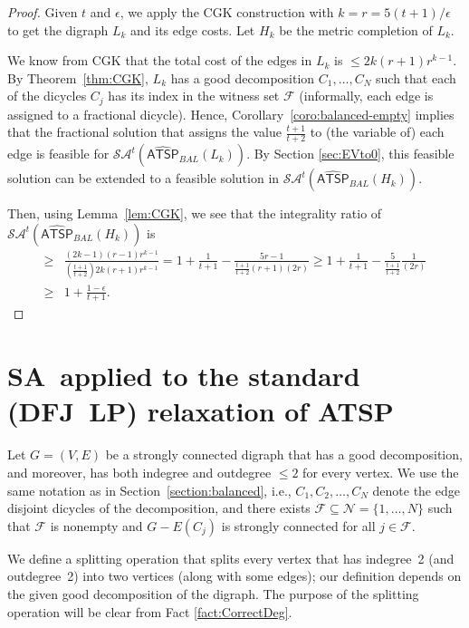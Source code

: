 \documentclass[11pt]{article}
\newcommand{\iSA}{\textsf{SA}}
\newcommand{\atspbalpolytope}{\widehat{\textsf{ATSP}}_{\mathit{BAL}}}
\newcommand{\cindset}{\mathcal{N}}
\newcommand{\fracset}{\mathcal{F}}
\newcommand{\saop}{\mathcal{SA}}
\newcommand{\homog}[1]{{#1}}
\begin{document}
\begin{proof}
Given $t$ and $\epsilon$, we apply the CGK construction
with $k=r= 5(t+1)/\epsilon$ to get the digraph $L_k$
and its edge costs. Let $H_k$ be the metric completion of $L_k$.

We know from CGK \cite{CGK06} that
the total cost of the edges in $L_k$ is $\leq 2k(r+1)r^{k-1}$.
By Theorem~\ref{thm:CGK}, $L_k$ has a good decomposition $C_1,\dots,C_N$
such that each of the dicycles $C_j$ has its index in the witness
set $\fracset$ (informally, each edge is assigned to a fractional
dicycle).
Hence, Corollary~\ref{coro:balanced-empty}
implies that the fractional solution that
assigns the value $\frac{t+1}{t+2}$ to (the variable of) each edge
is feasible for $\saop^t(\homog{\atspbalpolytope(L_k)})$. By Section \ref{sec:EVto0}, this feasible solution can
be extended to a feasible solution in $\saop^t(\homog{\atspbalpolytope(H_k)})$.

Then, using Lemma~\ref{lem:CGK},
we see that the integrality ratio of
$\saop^t(\homog{\atspbalpolytope(H_k)})$ is
\begin{align*}
\geq &
\frac{(2k-1)(r-1)r^{k-1}}{(\frac{t+1}{t+2})2k(r+1)r^{k-1}}
= 1+\frac{1}{t+1}-\frac{5r-1}{\frac{t+1}{t+2}(r+1)(2r)}
	\geq 1+\frac{1}{t+1}-\frac{5}{\frac{t+1}{t+2}}\frac{1}{(2r)}
\\
\geq & 1+ \frac{1-\epsilon}{t+1}. \nonumber
\end{align*}
\end{proof}





\section{\iSA\ applied to the standard (DFJ~LP) relaxation of ATSP}

Let $G = (V,E)$ be a strongly connected digraph
that has a good decomposition, and moreover,
has both indegree and outdegree $\le2$ for every vertex.
We use the same notation as in Section~\ref{section:balanced},
i.e., $C_1, C_2, \ldots, C_N$ denote the
edge disjoint dicycles of the decomposition,
and there exists $\fracset\subseteq\cindset=\{1,\dots,N\}$
such that $\fracset$ is nonempty and
$G-E(C_j)$ is strongly connected for all $j\in\fracset$.


We define a splitting operation that splits every vertex that
has indegree~2 (and outdegree~2)
into two vertices (along with some edges);
our definition depends on the given good decomposition of the digraph.
The purpose of the splitting operation will be
clear from Fact \ref{fact:CorrectDeg}.
\end{document}
